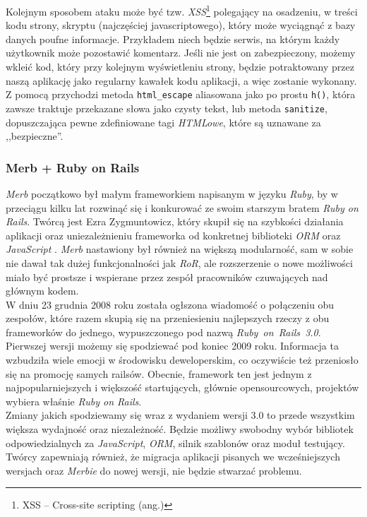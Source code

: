 \documentclass[a4paper,12pt]{article}
\begin{document}
Kolejnym sposobem ataku może być tzw. \emph{XSS}\footnote{XSS -- Cross-site scripting
(ang.)} polegający na osadzeniu, w treści kodu strony, skryptu (najczęściej
javascriptowego), który może wyciągnąć z bazy danych poufne informacje. Przykładem niech
będzie serwis, na którym każdy użytkownik może pozostawić komentarz. Jeśli nie jest on
zabezpieczony, możemy wkleić kod, który przy kolejnym wyświetleniu strony, będzie potraktowany
przez naszą aplikację jako regularny kawałek kodu aplikacji, a więc zostanie wykonany.\\
Z pomocą przychodzi metoda \texttt{html\_escape} aliasowana jako po prostu \texttt{h()},
która zawsze traktuje przekazane słowa jako czysty tekst, lub metoda \texttt{sanitize},
dopuszczająca pewne zdefiniowane tagi \emph{HTMLowe}, które są uznawane za ,,bezpieczne''.

\subsubsection{Merb + Ruby on Rails}
\emph{Merb} początkowo był małym frameworkiem napisanym w języku \emph{Ruby}, by w
przeciągu kilku lat rozwinąć się i konkurować ze swoim starszym bratem \emph{Ruby on
Rails}. Twórcą jest Ezra Zygmuntowicz, który skupił się na szybkości działania aplikacji
oraz uniezależnieniu frameworka od konkretnej biblioteki \emph{ORM} oraz \emph{JavaScript
}. \emph{Merb} nastawiony był również na większą modularność, sam w sobie nie dawał tak
dużej funkcjonalności jak \emph{RoR}, ale rozszerzenie o nowe możliwości miało być
prostsze i wspierane przez zespół pracowników czuwających nad głównym kodem.\\
W dniu 23 grudnia 2008 roku została ogłszona wiadomość\cite{rails-merb} o połączeniu obu zespołów,
które razem skupią się na przeniesieniu najlepszych rzeczy z obu frameworków do jednego,
wypuszczonego pod nazwą \emph{Ruby~on~Rails~3.0}. Pierwszej wersji możemy się spodziewać
pod koniec 2009 roku. Informacja ta wzbudziła wiele emocji w środowisku deweloperskim, co
oczywiście też przeniosło się na promocję samych railsów. Obecnie, framework ten jest
jednym z najpopularniejszych i większość startujących, głównie opensourcowych,
projektów wybiera właśnie \emph{Ruby on Rails}.\\
Zmiany jakich spodziewamy się wraz z wydaniem wersji 3.0 to przede wszystkim większa
wydajność oraz niezależność. Będzie możliwy swobodny wybór bibliotek odpowiedzialnych za
\emph{JavaScript}, \emph{ORM}, silnik szablonów oraz moduł testujący. Twórcy zapewniają
również, że migracja aplikacji pisanych we wcześniejszych wersjach oraz \emph{Merbie} do nowej
wersji, nie będzie stwarzać problemu.
\end{document}
